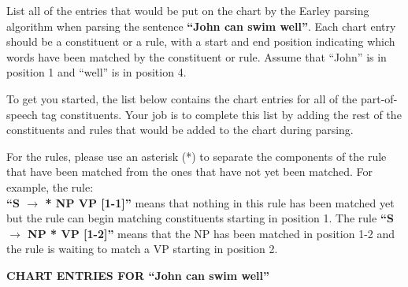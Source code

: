 \documentclass[11pt]{article}
\begin{document}
\begin{enumerate}
List all of the entries that would be put on the chart by the Earley
parsing algorithm when parsing the sentence {\bf ``John can swim
  well''}.  Each chart entry should be a constituent or a rule, with a
start and end position indicating which words have been matched by the
constituent or rule. Assume that ``John'' is in position 1 and
``well'' is in position 4.

To get you started, the list below contains the chart entries for all
of the part-of-speech tag constituents. Your job is to complete
this list by adding the rest of the constituents and rules that would
be added to the chart during parsing.

For the rules, please use an asterisk (*) to separate the components
of the rule that have been matched from the ones that have not yet
been matched. For example, the rule: \\ {\bf ``S $\rightarrow$ * NP VP
  [1-1]''} means that nothing in this rule has been matched yet but
the rule can begin matching constituents starting in position 1.  The
rule {\bf ``S $\rightarrow$ NP * VP [1-2]''} means that the NP has
been matched in position 1-2 and the rule is waiting to match a VP
starting in position 2.

\begin{center}
{\bf CHART ENTRIES FOR ``John can swim well''} 


\end{center}
\end{enumerate}
\end{document}
